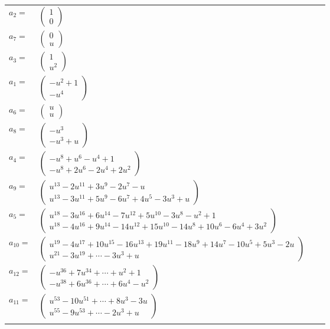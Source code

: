 \documentclass[1p]{elsarticle_modified}
\theoremstyle{definition}
\begin{document}
\begin{tabular}{m{7pt} m{180pt} m{7pt} m{180pt} }
\flushright $a_{2}=$&$\begin{pmatrix}1\\0\end{pmatrix}$ \\
\flushright $a_{7}=$&$\begin{pmatrix}0\\u\end{pmatrix}$ \\
\flushright $a_{3}=$&$\begin{pmatrix}1\\u^2\end{pmatrix}$ \\
\flushright $a_{1}=$&$\begin{pmatrix}- u^2+1\\- u^4\end{pmatrix}$ \\
\flushright $a_{6}=$&$\begin{pmatrix}u\\u\end{pmatrix}$ \\
\flushright $a_{8}=$&$\begin{pmatrix}- u^3\\- u^3+u\end{pmatrix}$ \\
\flushright $a_{4}=$&$\begin{pmatrix}- u^8+u^6- u^4+1\\- u^8+2 u^6-2 u^4+2 u^2\end{pmatrix}$ \\
\flushright $a_{9}=$&$\begin{pmatrix}u^{13}-2 u^{11}+3 u^9-2 u^7- u\\u^{13}-3 u^{11}+5 u^9-6 u^7+4 u^5-3 u^3+u\end{pmatrix}$ \\
\flushright $a_{5}=$&$\begin{pmatrix}u^{18}-3 u^{16}+6 u^{14}-7 u^{12}+5 u^{10}-3 u^8- u^2+1\\u^{18}-4 u^{16}+9 u^{14}-14 u^{12}+15 u^{10}-14 u^8+10 u^6-6 u^4+3 u^2\end{pmatrix}$ \\
\flushright $a_{10}=$&$\begin{pmatrix}u^{19}-4 u^{17}+10 u^{15}-16 u^{13}+19 u^{11}-18 u^9+14 u^7-10 u^5+5 u^3-2 u\\u^{21}-3 u^{19}+\cdots-3 u^3+u\end{pmatrix}$ \\
\flushright $a_{12}=$&$\begin{pmatrix}- u^{36}+7 u^{34}+\cdots+u^2+1\\- u^{38}+6 u^{36}+\cdots+6 u^4- u^2\end{pmatrix}$ \\
\flushright $a_{11}=$&$\begin{pmatrix}u^{53}-10 u^{51}+\cdots+8 u^3-3 u\\u^{55}-9 u^{53}+\cdots-2 u^3+u\end{pmatrix}$\\&\end{tabular}
\end{document}
